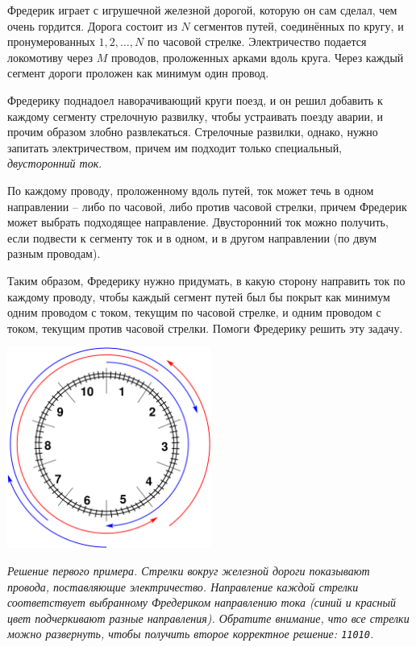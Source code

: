 \ifx\boi\undefined\fi
\def\version{jury-1}
Фредерик играет с игрушечной железной дорогой, которую он сам сделал, чем очень гордится.
Дорога состоит из $N$ сегментов путей, соединённых по кругу, и пронумерованных $1, 2, \dots, N$ по часовой стрелке.
Электричество подается локомотиву через $M$ проводов, проложенных арками вдоль круга. Через каждый сегмент дороги проложен как минимум один провод.

Фредерику поднадоел наворачивающий круги поезд, и он решил добавить к каждому сегменту стрелочную развилку, чтобы устраивать поезду аварии, и прочим образом злобно развлекаться.
Стрелочные развилки, однако, нужно запитать электричеством, причем им подходит только специальный, \emph{двусторонний ток}.

По каждому проводу, проложенному вдоль путей, ток может течь в одном направлении -- либо по часовой, либо против часовой стрелки, причем Фредерик может выбрать подходящее направление.
Двусторонний ток можно получить, если подвести к сегменту ток и в одном, и в другом направлении (по двум разным проводам).

Таким образом, Фредерику нужно придумать, в какую сторону направить ток по каждому проводу, чтобы каждый сегмент путей был бы покрыт как минимум одним проводом с током, текущим по часовой стрелке, 
и одним проводом с током, текущим против часовой стрелки. Помоги Фредерику решить эту задачу.

\vspace{2mm}
\begin{center}
\includegraphics[width=0.5\textwidth]{alternatingfig.pdf}
\end{center}
\vspace{1mm}
{\em Решение первого примера. Стрелки вокруг железной дороги показывают провода, поставляющие электричество. Направление каждой стрелки соответствует выбранному Фредериком направлению тока (синий и красный цвет подчеркивают разные направления). Обратите внимание, что все стрелки можно развернуть, чтобы получить второе корректное решение: \texttt{11010}.}

